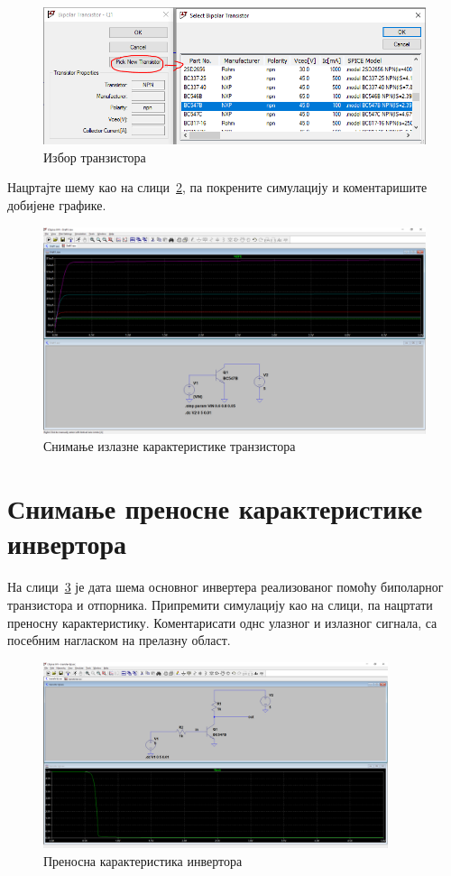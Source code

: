 \begin{figure}[h]
\centering
\includegraphics[width=\figwidth\textwidth]{figs/b2.PNG}
\caption{Избор транзистора}
\label{Fig:b2-partno}
\end{figure}

Нацртајте шему као на слици~\ref{Fig:b4-output}, па покрените симулацију и коментаришите добијене графике.

\begin{figure}[h]
\centering
\includegraphics[width=\figwidth\textwidth]{figs/b4.PNG}
\caption{Снимање излазне карактеристике транзистора}
\label{Fig:b4-output}
\end{figure}

\section{Снимање преносне карактеристике инвертора}

На слици~\ref{Fig:b5-transfer} је дата шема основног инвертера реализованог помоћу биполарног транзистора и отпорника. Припремити симулацију као на слици, па нацртати преносну карактеристику. Коментарисати однс улазног и излазног сигнала, са посебним нагласком на прелазну област.

\begin{figure}[h]
\centering
\includegraphics[width=0.9\textwidth]{figs/b5.PNG}
\caption{Преносна карактеристика инвертора}
\label{Fig:b5-transfer}
\end{figure}

